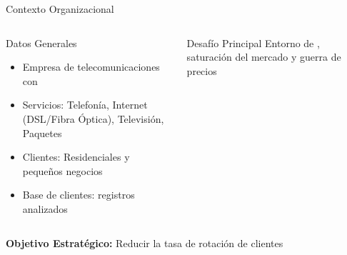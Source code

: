 
\begin{frame}{Contexto Organizacional}
    \begin{columns}[t]
        \begin{block}{Datos Generales}
            \begin{itemize}
                \item Empresa de telecomunicaciones con 
                \item Servicios: Telefonía, Internet (DSL/Fibra Óptica), Televisión, Paquetes
                \item Clientes: Residenciales y pequeños negocios
                \item Base de clientes:  registros analizados
            \end{itemize}
        \end{block}
        
        \vsp
        \begin{alertblock}{Desafío Principal}
            Entorno de , saturación del mercado y guerra de precios
        \end{alertblock}
        
        \begin{center}
        \end{center}
    \end{columns}
    
    \vspb
    \begin{center}
        \textbf{Objetivo Estratégico:} Reducir la tasa de rotación de clientes
    \end{center}
\end{frame}

